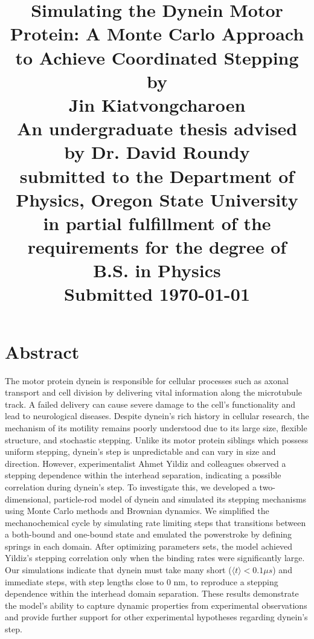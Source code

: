 \documentclass[12pt]{report}
\title{
	\Large{Simulating the Dynein Motor Protein: A Monte Carlo Approach to Achieve Coordinated Stepping}\vspace{1em}\\
	\large{by} \\ 
	\Large{Jin Kiatvongcharoen} \vspace{0.5em}\\[2in] 
	\normalsize{An undergraduate thesis advised by Dr. David Roundy}\\
	\normalsize{submitted to the Department of Physics, Oregon State University}\\%
	\normalsize{in partial fulfillment of the requirements for the degree of}\\
	\normalsize{B.S. in Physics}\vspace{1.5 em}\\
	\normalsize{Submitted \today}\\


}
\date{}
\begin{document}
    \maketitle
    \onehalfspacing


	\chapter*{Abstract}
	The motor protein dynein is responsible for cellular processes such as axonal transport and cell division by delivering vital information along the microtubule track. A failed delivery can cause severe damage to the cell’s functionality and lead to neurological diseases. Despite dynein's rich history in cellular research, the mechanism of its motility remains poorly understood due to its large size, flexible structure, and stochastic stepping. Unlike its motor protein siblings which possess uniform stepping, dynein's step is unpredictable and can vary in size and direction. However, experimentalist Ahmet Yildiz and colleagues observed a stepping dependence within the interhead separation, indicating a possible correlation during dynein's step. To investigate this, we developed a two-dimensional, particle-rod model of dynein and simulated its stepping mechanisms using Monte Carlo methods and Brownian dynamics. We simplified the mechanochemical cycle by simulating rate limiting steps that transitions between a both-bound and one-bound state and emulated the powerstroke by defining springs in each domain. After optimizing parameters sets, the model achieved Yildiz's stepping correlation only when the binding rates were significantly large. Our simulations indicate that dynein must take many short ($\langle t \rangle < 0.1 \mu s$) and immediate steps, with step lengths close to 0 nm, to reproduce a stepping dependence within the interhead domain separation. These results demonstrate the model's ability to capture dynamic properties from experimental observations and provide further support for other experimental hypotheses regarding dynein's step.
	
	 
%	
%	
	
\end{document}
